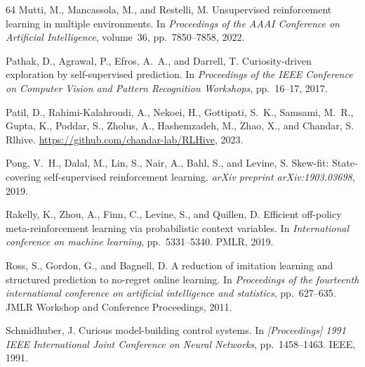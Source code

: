 \documentclass{article}
\theoremstyle{plain}
\theoremstyle{definition}
\theoremstyle{remark}
\begin{document}
\begin{thebibliography}{64}
Mutti, M., Mancassola, M., and Restelli, M.
\newblock Unsupervised reinforcement learning in multiple environments.
\newblock In \emph{Proceedings of the AAAI Conference on Artificial
  Intelligence}, volume~36, pp.\  7850--7858, 2022{}.

Pathak, D., Agrawal, P., Efros, A.~A., and Darrell, T.
\newblock Curiosity-driven exploration by self-supervised prediction.
\newblock In \emph{Proceedings of the IEEE Conference on Computer Vision and
  Pattern Recognition Workshops}, pp.\  16--17, 2017.

Patil, D., Rahimi-Kalahroudi, A., Nekoei, H., Gottipati, S.~K., Samsami, M.~R.,
  Gupta, K., Poddar, S., Zholus, A., Hashemzadeh, M., Zhao, X., and Chandar, S.
\newblock Rlhive.
\newblock \url{https://github.com/chandar-lab/RLHive}, 2023.

Pong, V.~H., Dalal, M., Lin, S., Nair, A., Bahl, S., and Levine, S.
\newblock Skew-fit: State-covering self-supervised reinforcement learning.
\newblock \emph{arXiv preprint arXiv:1903.03698}, 2019.

Rakelly, K., Zhou, A., Finn, C., Levine, S., and Quillen, D.
\newblock Efficient off-policy meta-reinforcement learning via probabilistic
  context variables.
\newblock In \emph{International conference on machine learning}, pp.\
  5331--5340. PMLR, 2019.

Ross, S., Gordon, G., and Bagnell, D.
\newblock A reduction of imitation learning and structured prediction to
  no-regret online learning.
\newblock In \emph{Proceedings of the fourteenth international conference on
  artificial intelligence and statistics}, pp.\  627--635. JMLR Workshop and
  Conference Proceedings, 2011.

Schmidhuber, J.
\newblock Curious model-building control systems.
\newblock In \emph{[Proceedings] 1991 IEEE International Joint Conference on
  Neural Networks}, pp.\  1458--1463. IEEE, 1991.


\end{thebibliography}
\end{document}
